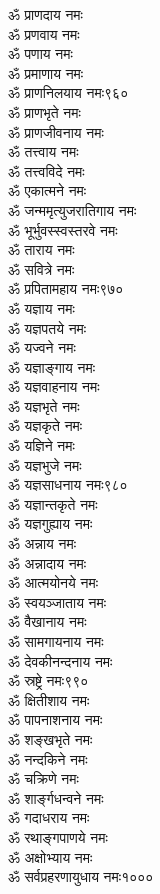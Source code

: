 \begin{center}
\begin{multicols}{2}
\begin{flushleft}
ॐ प्राणदाय नमः\\
ॐ प्रणवाय नमः\\
ॐ पणाय नमः\\
ॐ प्रमाणाय नमः\\
ॐ प्राणनिलयाय नमः\hfill ९६०\\
ॐ प्राणभृते नमः\\
ॐ प्राणजीवनाय नमः\\
ॐ तत्त्वाय नमः\\
ॐ तत्त्वविदे नमः\\
ॐ एकात्मने नमः\\
ॐ जन्ममृत्युजरातिगाय नमः\\
ॐ भूर्भुवस्स्वस्तरवे नमः\\
ॐ ताराय नमः\\
ॐ सवित्रे नमः\\
ॐ प्रपितामहाय नमः\hfill ९७०\\
ॐ यज्ञाय नमः\\
ॐ यज्ञपतये नमः\\
ॐ यज्वने नमः\\
ॐ यज्ञाङ्गाय नमः\\
ॐ यज्ञवाहनाय नमः\\
ॐ यज्ञभृते नमः\\
ॐ यज्ञकृते नमः\\
ॐ यज्ञिने नमः\\
ॐ यज्ञभुजे नमः\\
ॐ यज्ञसाधनाय नमः\hfill ९८०\\
ॐ यज्ञान्तकृते नमः\\
ॐ यज्ञगुह्याय नमः\\
ॐ अन्नाय नमः\\
ॐ अन्नादाय नमः\\
ॐ आत्मयोनये नमः\\
ॐ स्वयञ्जाताय नमः\\
ॐ वैखानाय नमः\\
ॐ सामगायनाय नमः\\
ॐ देवकीनन्दनाय नमः\\
ॐ स्रष्ट्रे नमः\hfill ९९०\\
ॐ क्षितीशाय नमः\\
ॐ पापनाशनाय नमः\\
ॐ शङ्खभृते नमः\\
ॐ नन्दकिने नमः\\
ॐ चक्रिणे नमः\\
ॐ शार्ङ्गधन्वने नमः\\
ॐ गदाधराय नमः\\
ॐ रथाङ्गपाणये नमः\\
ॐ अक्षोभ्याय नमः\\
ॐ सर्वप्रहरणायुधाय नमः\hfill १०००
\end{flushleft}
\end{multicols}


\end{center}
